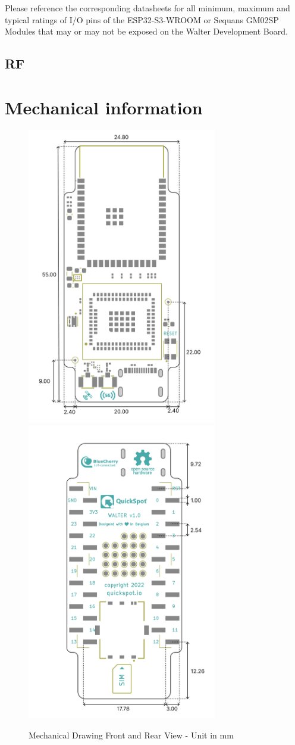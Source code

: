 \documentclass[11pt]{article}
\begin{document}
Please reference the corresponding datasheets for all minimum, maximum and typical ratings of I/O pins of the ESP32-S3-WROOM or Sequans GM02SP Modules that may or may not be exposed on the Walter Development Board.
\subsection{RF}
\newpage
\section{Mechanical information}
\begin{figure}[h]
    \centering
    \includegraphics[height=13cm]{mechanical-front.png}
    \includegraphics[height=13cm]{mechanical-back.png}
    \caption{Mechanical Drawing Front and Rear View - Unit in mm}
    \label{fig:mechanical_front}
\end{figure}
\end{document}
